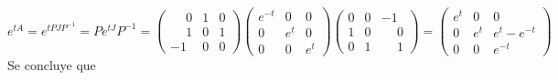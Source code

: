 \documentclass[11pt]{report}
\begin{document}
\[e^{tA}=e^{tPJP^{-1}}=Pe^{tJ}P^{-1}=\begin{pmatrix}
    \phantom{-}0 & 1 & 0 \\
    \phantom{-}1 & 0 & 1 \\
    -1 & 0 & 0
\end{pmatrix}\begin{pmatrix}
    e^{-t} & 0 & 0 \\
    0 & e^t & 0 \\
    0 & 0 & e^t
\end{pmatrix}\begin{pmatrix}
    0 & 0 & -1 \\
    1 & 0 & \phantom{-}0 \\
    0 & 1 & \phantom{-}1
\end{pmatrix}=\begin{pmatrix}
    e^t & 0 & 0 \\
    0 & e^t & e^t-e^{-t} \\
    0  & 0 & e^{-t}
\end{pmatrix}\]
Se concluye que
\end{document}
